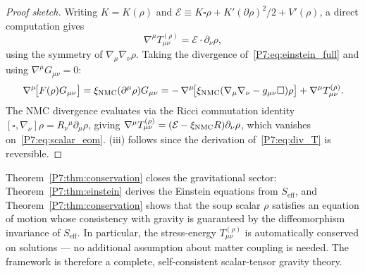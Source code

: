 \begin{proof}[Proof sketch]
Writing $K=K(\rho)$ and $\mathcal{E}\equiv K\square\rho+K'(\partial\rho)^2/2+V'(\rho)$,
a direct computation gives
\begin{equation}
  \nabla^\mu T_{\mu\nu}^{(\rho)}
  = \mathcal{E}\cdot\partial_\nu\rho,
  \label{P7:eq:div_T}
\end{equation}
using the symmetry of $\nabla_\mu\nabla_\nu\rho$. Taking the divergence
of~\eqref{P7:eq:einstein_full} and using $\nabla^\mu G_{\mu\nu}=0$:
\begin{equation}
  \nabla^\mu\!\bigl[F(\rho)G_{\mu\nu}\bigr]
  = \xi_{\mathrm{NMC}}(\partial^\mu\rho)G_{\mu\nu}
  = -\,\nabla^\mu\!\bigl[\xi_{\mathrm{NMC}}(\nabla_\mu\nabla_\nu - g_{\mu\nu}\square)\rho\bigr]
  + \nabla^\mu T_{\mu\nu}^{(\rho)}.
  \label{P7:eq:bianchi_split}
\end{equation}
The NMC divergence evaluates via the Ricci commutation identity
$[\square,\nabla_\nu]\rho=R_\nu{}^\mu\partial_\mu\rho$, giving
$\nabla^\mu T_{\mu\nu}^{(\rho)}=(\mathcal{E}-\xi_{\mathrm{NMC}} R)\partial_\nu\rho$,
which vanishes on~\eqref{P7:eq:scalar_eom}. (iii) follows since the
derivation of~\eqref{P7:eq:div_T} is reversible.
\end{proof}

\begin{remark}
\label{P7:rem:conservation_physical_content}
Theorem~\ref{P7:thm:conservation} closes the gravitational sector:
Theorem~\ref{P7:thm:einstein} derives the Einstein equations from $S_{\mathrm{eff}}$,
and Theorem~\ref{P7:thm:conservation} shows that the soup scalar $\rho$ satisfies
an equation of motion whose consistency with gravity is guaranteed by the
diffeomorphism invariance of $S_{\mathrm{eff}}$.
In particular, the stress-energy $T_{\mu\nu}^{(\rho)}$ is automatically
conserved on solutions --- no additional assumption about matter coupling is needed.
The framework is therefore a complete, self-consistent scalar-tensor gravity theory.
\end{remark}

